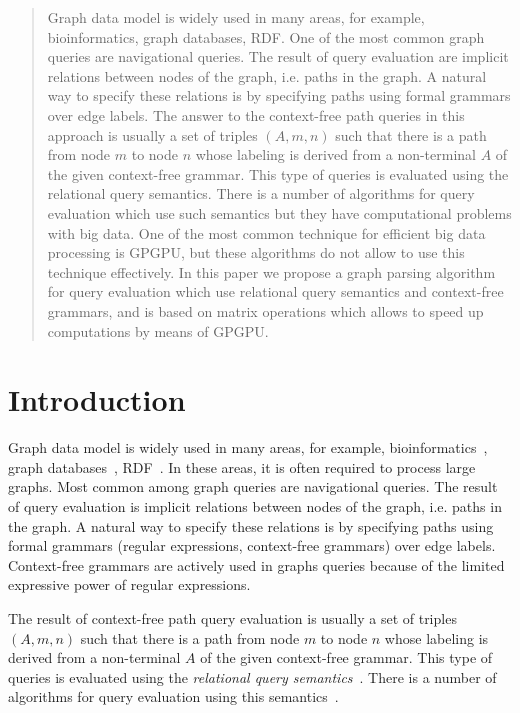 \documentclass{vldb}
\begin{document}
\begin{abstract}
Graph data model is widely used in many areas, for example, bioinformatics, graph databases, RDF. One of the most common graph queries are navigational queries. The result of query evaluation are implicit relations between nodes of the graph, i.e. paths in the graph. A natural way to specify these relations is by specifying paths using formal grammars over edge labels. The answer to the context-free path queries in this approach is usually a set of triples $(A, m, n)$ such that there is a path from node $m$ to node $n$ whose labeling is derived from a non-terminal $A$ of the given context-free grammar. This type of queries is evaluated using the relational query semantics. There is a number of algorithms for query evaluation which use such semantics but they have computational problems with big data. One of the most common technique for efficient big data processing is GPGPU, but these algorithms do not allow to use this technique effectively. In this paper we propose a graph parsing algorithm for query evaluation which use relational query semantics and context-free grammars, and is based on matrix operations which allows to speed up computations by means of GPGPU.
\end{abstract}

\section{Introduction}
Graph data model is widely used in many areas, for example, bioinformatics~\cite{Bio}, graph databases~\cite{graphDB}, RDF~\cite{RDF}. In these areas, it is often required to process large graphs. Most common among graph queries are navigational queries. The result of query evaluation is implicit relations between nodes of the graph, i.e. paths in the graph. A natural way to specify these relations is by specifying paths using formal grammars (regular expressions, context-free grammars) over edge labels. Context-free grammars are actively used in graphs queries because of the limited expressive power of regular expressions. 

The result of context-free path query evaluation is usually a set of triples $(A, m, n)$ such that there is a path from node $m$ to node $n$ whose labeling is derived from a non-terminal $A$ of the given context-free grammar. This type of queries is evaluated using the \textit{relational query semantics}~\cite{hellingsRelational}. There is a number of algorithms for query evaluation using this semantics~\cite{GLL, hellingsRelational, RDF}.
\end{document}

